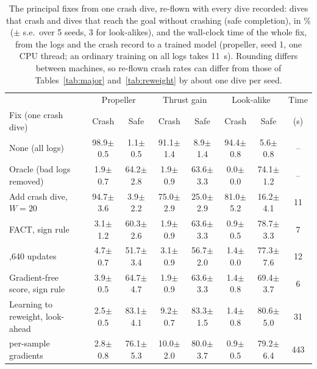 \documentclass[preprint,12pt]{elsarticle}
\newcommand{\method}{FACT}
\newcommand{\pmse}[2]{#1{\scriptsize$\pm$#2}}
\begin{document}
\begin{table}[t]
\caption{The principal fixes from one crash dive, re-flown with every dive recorded: dives that crash and dives that reach the goal without crashing (safe completion), in \% ($\pm$ s.e.\ over 5 seeds, 3 for look-alikes), and the wall-clock time of the whole fix, from the logs and the crash record to a trained model (propeller, seed 1, one CPU thread; an ordinary training on all logs takes 11~s). Rounding differs between machines, so re-flown crash rates can differ from those of Tables~\ref{tab:major} and~\ref{tab:reweight} by about one dive per seed.}
\label{tab:safe}
\centering\footnotesize
\setlength{\tabcolsep}{2pt}
\begin{tabular}{@{}lccccccc@{}}
\toprule
 & \multicolumn{2}{c}{Propeller} & \multicolumn{2}{c}{Thrust gain} & \multicolumn{2}{c}{Look-alike} & Time \\
Fix (one crash dive) & Crash & Safe & Crash & Safe & Crash & Safe & (s) \\
\midrule
None (all logs) & \pmse{98.9}{0.5} & \pmse{1.1}{0.5} & \pmse{91.1}{1.4} & \pmse{8.9}{1.4} & \pmse{94.4}{0.8} & \pmse{5.6}{0.8} & -- \\
Oracle (bad logs removed) & \pmse{1.9}{0.7} & \pmse{64.2}{2.8} & \pmse{1.9}{0.9} & \pmse{63.6}{3.3} & \pmse{0.0}{0.0} & \pmse{74.1}{1.2} & -- \\
Add crash dive, $W=20$ & \pmse{94.7}{3.6} & \pmse{3.9}{2.2} & \pmse{75.0}{2.9} & \pmse{25.0}{2.9} & \pmse{81.0}{5.2} & \pmse{16.2}{4.1} & 11 \\
\method{}, sign rule & \pmse{3.1}{1.2} & \pmse{60.3}{2.6} & \pmse{1.9}{0.9} & \pmse{63.6}{3.3} & \pmse{0.9}{0.5} & \pmse{78.7}{3.3} & 7 \\
\quad 2,640 updates & \pmse{4.7}{0.7} & \pmse{51.7}{3.4} & \pmse{3.1}{0.9} & \pmse{56.7}{2.0} & \pmse{1.4}{0.0} & \pmse{77.3}{7.6} & 12 \\
Gradient-free score, sign rule & \pmse{3.9}{0.5} & \pmse{64.7}{4.7} & \pmse{1.9}{0.9} & \pmse{63.6}{3.3} & \pmse{1.4}{0.8} & \pmse{69.4}{3.7} & 6 \\
Learning to reweight, look-ahead & \pmse{2.5}{0.5} & \pmse{83.1}{4.1} & \pmse{9.2}{0.7} & \pmse{83.3}{1.5} & \pmse{1.4}{0.8} & \pmse{80.6}{5.0} & 31 \\
\quad per-sample gradients & \pmse{2.8}{0.8} & \pmse{76.1}{5.3} & \pmse{10.0}{2.0} & \pmse{80.0}{3.7} & \pmse{0.9}{0.5} & \pmse{79.2}{6.4} & 443 \\
\bottomrule
\end{tabular}
\end{table}
\end{document}
